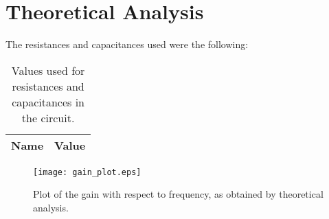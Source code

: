 \section{Theoretical Analysis} \label{sec:analysis}

The resistances and capacitances used were the following:


\begin{table}[H]
  \centering
  \begin{tabular}{|c|c|}
    \hline    
    {\bf Name} & {\bf Value} \\ \hline
    
  \end{tabular}
  \caption{Values used for resistances and capacitances in the circuit.}
  \label{tab:chosen_values}
\end{table}

\begin{figure}[H] \centering
  \texttt{[image: gain\_plot.eps]}
  \caption{Plot of the gain with respect to frequency, as obtained by theoretical analysis.}
  \label{fig:gain_plot}
\end{figure}
